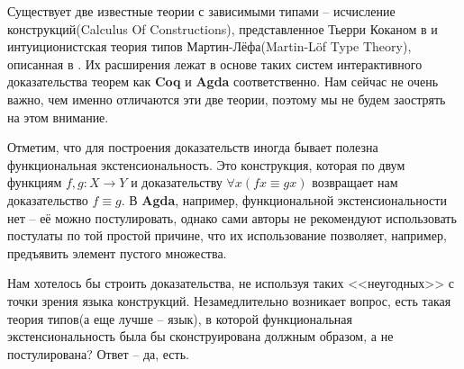 Существует две известные теории с зависимыми типами -- исчисление конструкций(Calculus Of Constructions), представленное Тьерри Коканом в \cite{coquand1988calculus} и интуиционистская теория типов Мартин-Лёфа(Martin-L{\"o}f Type Theory), описанная в \cite{martin1975intuitionistic}. Их расширения лежат в основе таких систем интерактивного доказательства теорем как \textbf{Coq} и \textbf{Agda} соответственно. Нам сейчас не очень важно, чем именно отличаются эти две теории, поэтому мы не будем заострять на этом внимание.

Отметим, что для построения доказательств иногда бывает полезна функциональная экстенсиональность. Это конструкция, которая по двум функциям $f, g : X \to Y$ и доказательству $\forall x (f x \equiv g x)$ возвращает нам доказательство $f \equiv g$. В \textbf{Agda}, например, функциональной экстенсиональности нет -- её можно постулировать, однако сами авторы не рекомендуют использовать постулаты по той простой причине, что их использование позволяет, например, предъявить элемент пустого множества.

Нам хотелось бы строить доказательства, не используя таких <<неугодных>> с точки зрения языка конструкций. Незамедлительно возникает вопрос, есть такая теория типов(а еще лучше -- язык), в которой функциональная экстенсиональность была бы сконструирована должным образом, а не постулирована? Ответ -- да, есть.

